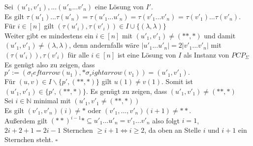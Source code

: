 \begin{lemma}{}
    Sei $(u'_1,v'_1),...(u'_n...v'_n)$ eine Lösung von $I'$. \\
    Es gilt $\tau(u'_1)...\tau(u'_n) = \tau(u'_1...u'_n) = \tau(v'_1...v'_n)$ = $\tau(v'_1)...\tau(v'_n)$. \\
    Für $i \in [n]$ gilt $(\tau(u'_i), \tau(v'_i)) \in I \cup \{(\lambda, \lambda)\}$ \\

    Weiter gibt es mindestens ein $i \in [n]$ mit $(u'_1,v'_1) \neq (**,*)$ und damit $(u'_1,v'_1) \neq
    (\lambda, \lambda)$, denn andernfalls wäre $|u'_1...u'_n| = 2|v'_1...v'_n|$ mit $(\tau(u'_i)), \tau(v'_i)$ für alle $i \in [n]$ 
    ist eine Lösung von $I$ als Instanz von $PCP_\Sigma$ \\

    Es genügt also zu zeigen, dass $p' := (\sigma_leftarrow(u_1),*\sigma_rightarrow(v_1)) =(u'_1, v'_1). $\\
    Für $(u,v) \in I \backslash \{p',(**,*)\}$ gilt $u(1) \neq v(1)$. Somit ist $(u'_1, v'_1) \in \{p',(**,*)\}$.
    Es genügt zu zeigen, dass $(u'_1,v'_1) \neq (**,*)$ \\

    Sei $i \in \mathbb{N}$ minimal mit $(u'_1, v'_1 \neq (**,*))$ \\
    Es gilt $(v'_1,v'_n)(i) \neq *$ oder $(v'_1,...,v'_n)(i+1) \neq **$. \\
    Außerdem gilt $(**)^{i-1} * \subseteq u'_1 ... u'_n = v'_1 ... v'_n$ also folgt $i=1$,
    $2i+2+1 = 2i-1$ Sternchen $\geq i+1 \Leftrightarrow i \geq 2$, da oben an Stelle $i$ und $i+1$ ein Sternchen steht. $\square$

\end{lemma}
